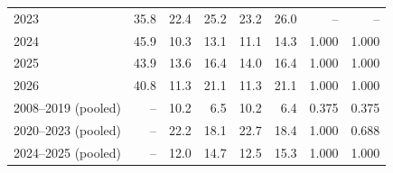 \begin{table}[H]
\begin{tabular}{@{}lrrrrrrr@{}}
2023 & 35.8 & 22.4 & 25.2 & 23.2 & 26.0 & -- & -- \\
2024 & 45.9 & 10.3 & 13.1 & 11.1 & 14.3 & 1.000 & 1.000 \\
2025 & 43.9 & 13.6 & 16.4 & 14.0 & 16.4 & 1.000 & 1.000 \\
2026 & 40.8 & 11.3 & 21.1 & 11.3 & 21.1 & 1.000 & 1.000 \\
\midrule
2008--2019 (pooled) & -- & 10.2 & 6.5 & 10.2 & 6.4 & 0.375 & 0.375 \\
2020--2023 (pooled) & -- & 22.2 & 18.1 & 22.7 & 18.4 & 1.000 & 0.688 \\
2024--2025 (pooled) & -- & 12.0 & 14.7 & 12.5 & 15.3 & 1.000 & 1.000 \\
\bottomrule
\end{tabular}
\end{table}
